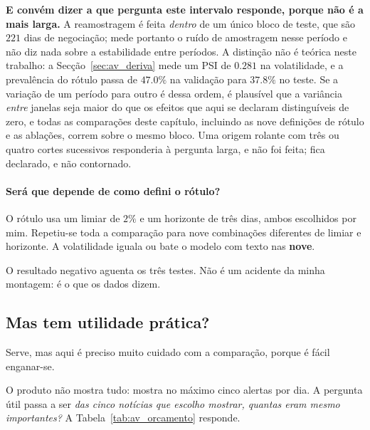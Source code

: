 \textbf{E convém dizer a que pergunta este intervalo responde, porque não é a mais larga.} A
reamostragem é feita \emph{dentro} de um único bloco de teste, que são $221$ dias de negociação;
mede portanto o ruído de amostragem nesse período e não diz nada sobre a estabilidade entre
períodos. A distinção não é teórica neste trabalho: a Secção~\ref{sec:av_deriva} mede um
\gls{PSI} de $0.281$ na volatilidade, e a prevalência do rótulo passa de $47.0\%$ na validação
para $37.8\%$ no teste. Se a variação de um período para outro é dessa ordem, é plausível que a
variância \emph{entre} janelas seja maior do que os efeitos que aqui se declaram distinguíveis de
zero, e todas as comparações deste capítulo, incluindo as nove definições de rótulo e as
ablações, correm sobre o mesmo bloco. Uma origem rolante com três ou quatro cortes sucessivos
responderia à pergunta larga, e não foi feita; fica declarado, e não contornado.

\paragraph{Será que depende de como defini o rótulo?} O rótulo usa um limiar de $2\%$ e um horizonte
de três dias, ambos escolhidos por mim. Repetiu-se toda a comparação para nove combinações
diferentes de limiar e horizonte. A volatilidade iguala ou bate o modelo com texto nas
\textbf{nove}.

O resultado negativo aguenta os três testes. Não é um acidente da minha montagem: é o que os dados dizem.

\subsection{Mas tem utilidade prática?}

Serve, mas aqui é preciso muito cuidado com a comparação, porque é fácil enganar-se.

O produto não mostra tudo: mostra no máximo cinco alertas por dia. A pergunta útil passa a ser
\emph{das cinco notícias que escolho mostrar, quantas eram mesmo importantes?}
A Tabela~\ref{tab:av_orcamento} responde.

